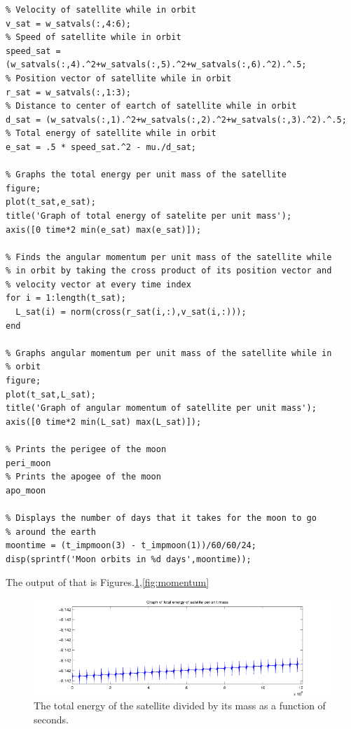 \documentclass{article}
\begin{document}
\begin{verbatim}
% Velocity of satellite while in orbit
v_sat = w_satvals(:,4:6);
% Speed of satellite while in orbit
speed_sat =
(w_satvals(:,4).^2+w_satvals(:,5).^2+w_satvals(:,6).^2).^.5;
% Position vector of satellite while in orbit
r_sat = w_satvals(:,1:3);
% Distance to center of eartch of satellite while in orbit
d_sat = (w_satvals(:,1).^2+w_satvals(:,2).^2+w_satvals(:,3).^2).^.5;
% Total energy of satellite while in orbit
e_sat = .5 * speed_sat.^2 - mu./d_sat;

% Graphs the total energy per unit mass of the satellite
figure;
plot(t_sat,e_sat);
title('Graph of total energy of satelite per unit mass');
axis([0 time*2 min(e_sat) max(e_sat)]);

% Finds the angular momentum per unit mass of the satellite while
% in orbit by taking the cross product of its position vector and
% velocity vector at every time index
for i = 1:length(t_sat);
  L_sat(i) = norm(cross(r_sat(i,:),v_sat(i,:)));
end

% Graphs angular momentum per unit mass of the satellite while in
% orbit
figure;
plot(t_sat,L_sat);
title('Graph of angular momentum of satellite per unit mass');
axis([0 time*2 min(L_sat) max(L_sat)]);

% Prints the perigee of the moon
peri_moon
% Prints the apogee of the moon
apo_moon

% Displays the number of days that it takes for the moon to go
% around the earth
moontime = (t_impmoon(3) - t_impmoon(1))/60/60/24;
disp(sprintf('Moon orbits in %d days',moontime));
\end{verbatim}

\noindent
The output of that is Figures.\ref{fig:energy},\ref{fig:momentum}

\begin{figure}[H]\centering
  \includegraphics[width=\textwidth]{satelliteenergy.png}
  \caption{The total energy of the satellite divided by its mass as a
    function of seconds.}
  \label{fig:energy}
\end{figure}
\end{document}

